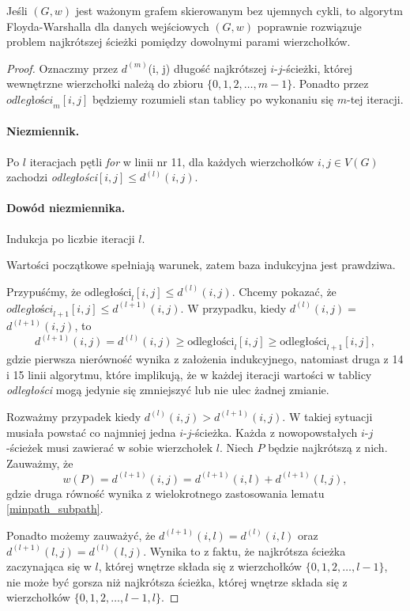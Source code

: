 \begin{theorem}
	Jeśli $(G, w)$ jest ważonym grafem skierowanym
	bez ujemnych cykli, to algorytm Floyda-Warshalla dla 
	danych wejściowych $(G, w)$ poprawnie
	rozwiązuje problem najkrótszej ścieżki 
	pomiędzy dowolnymi parami wierzchołków.
	
	\begin{proof}
		Oznaczmy przez $d^{(m)}$(i, j) długość najkrótszej
		$i$-$j$-ścieżki, której wewnętrzne wierzchołki 
		należą do zbioru $\{0, 1, 2, \dots, m-1\}$. 
		Ponadto przez
		$\textit{odległości}_{m}[i, j]$ będziemy rozumieli 
		stan tablicy po 
		wykonaniu się $m$-tej iteracji.
		
		\paragraph{Niezmiennik.} Po $l$ iteracjach 
		pętli \textit{for} w linii nr 11, dla każdych wierzchołków
		$i, j \in V(G)$ zachodzi \textit{odległości}$[i,j] \leq d^{(l)}(i,j)$.
		
		\paragraph{Dowód niezmiennika.} Indukcja po liczbie iteracji $l$.
		
		Wartości początkowe spełniają warunek, zatem
		baza indukcyjna jest prawdziwa. 
		
		Przypuśćmy, że $\text{odległości}_{l}[i, j] \leq
		d^{(l)}(i, j)$. Chcemy pokazać, że 
		$\textit{odległości}_{l+1}[i, j] \leq$$ d^{(l+1)}(i, j)$.
		W przypadku, kiedy $d^{(l)}(i,j) =$$ d^{(l+1)}(i,j)$, to
		\[d^{(l+1)}(i,j) = d^{(l)}(i, j) \geq 
		\text{odległości}_l[i, j] \geq \text{odległości}_{l+1}[i, j],\]
		gdzie pierwsza nierówność wynika z założenia indukcyjnego, natomiast
		druga z 14 i 15 linii algorytmu, które implikują, że
		w każdej iteracji wartości w tablicy \textit{odległości} mogą jedynie się zmniejszyć lub
		nie ulec żadnej zmianie.
		
		Rozważmy przypadek kiedy $d^{(l)}(i,j) >$$ d^{(l+1)}(i,j)$. 
		W takiej sytuacji musiała powstać co najmniej jedna 
		$i$-$j$-ścieżka. Każda z nowopowstałych $i$-$j$-ścieżek
		musi zawierać w sobie wierzchołek $l$. Niech 
		$P$ będzie najkrótszą z nich. Zauważmy, że
		\[w(P) = d^{(l+1)}(i, j) = 
		d^{(l+1)}(i, l) + d^{(l+1)}(l, j),\]
		gdzie druga równość wynika z wielokrotnego zastosowania 
		lematu \ref{minpath_subpath}.
		
		Ponadto możemy zauważyć, że $d^{(l+1)}(i, l) = d^{(l)}(i, l)$ 
		oraz $d^{(l+1)}(l, j) = d^{(l)}(l, j)$. Wynika to z faktu, że
		najkrótsza ścieżka zaczynająca się w $l$, której wnętrze składa się z wierzchołków 
		$\{0, 1, 2, \dots, l-1\}$,
		nie może być gorsza niż najkrótsza ścieżka, której 
		wnętrze składa się z wierzchołków 
		$\{0, 1, 2, \dots, l-1, l\}$.
		

\end{proof}
\end{theorem}
